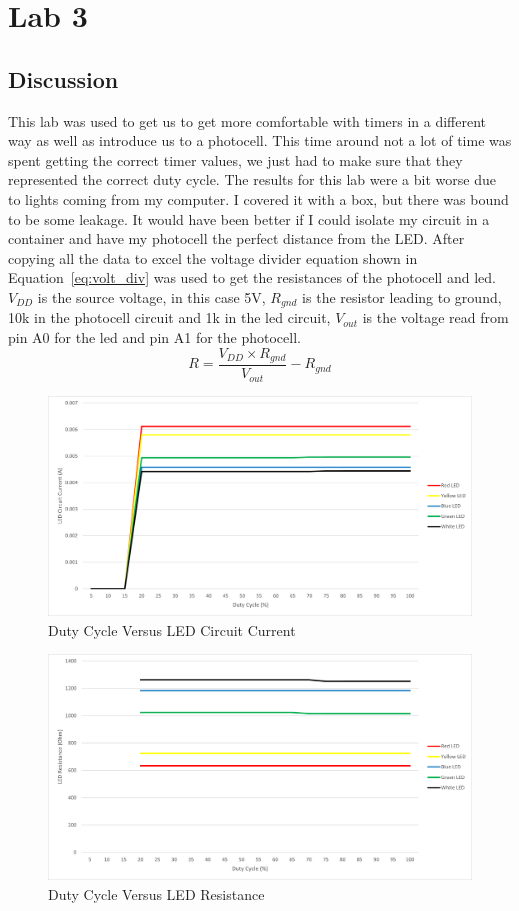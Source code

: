 \documentclass[12pt,titlepage]{article}
\begin{document}
\section{Lab 3}
\subsection{Discussion}
This lab was used to get us to get more comfortable with timers in a different way as well as introduce us
to a photocell. This time around not a lot of time was spent getting the correct timer values, we just
had to make sure that they represented the correct duty cycle. The results for this lab were a bit worse due
to lights coming from my computer. I covered it with a box, but there was bound to be some leakage.
It would have been better if I could isolate my circuit in a container and have my photocell the perfect
distance from the LED. After copying all the data to excel the voltage divider equation shown in 
Equation~\ref{eq:volt_div} was used to get the resistances of the photocell and led.
$V_{DD}$ is the source voltage, in this case 5V, $R_{gnd}$ is the resistor leading to ground, 10k in the
photocell circuit and 1k in the led circuit, $V_{out}$ is the voltage read from pin A0 for the led and pin A1
for the photocell.  
\begin{equation} \label{eq:volt_div}
  R = \frac{V_{DD} \times R_{gnd}}{V_{out}} - R_{gnd}
\end{equation}
\begin{figure}[!htb]
    \centering
    \includegraphics[width=5in]{lab_3/duty_cycle_led_circuit_curr.png}
    \caption{Duty Cycle Versus LED Circuit Current}\label{fig:duty_cycle_led_circuit_curr}
\end{figure}
\begin{figure}[!htb]
    \centering
    \includegraphics[width=5in]{lab_3/duty_cycle_led_res.png}
    \caption{Duty Cycle Versus LED Resistance}\label{fig:duty_cycle_led_res}
\end{figure}
\end{document}
